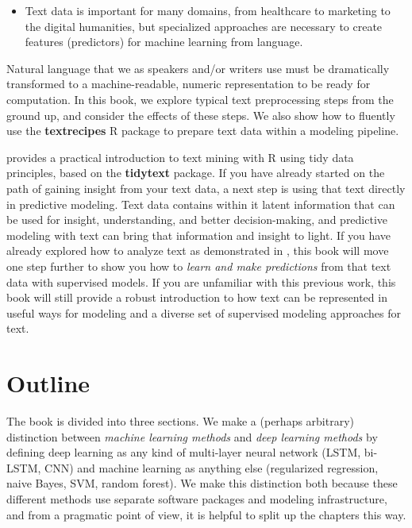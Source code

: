\documentclass[
]{krantz}
\newenvironment{rmdblock}[1]
  {\begin{shaded*}
  \begin{itemize}[left = -1cm, labelsep = 1cm]
  \renewcommand{\labelitemi}{
    \raisebox{-.7\height}[0pt][0pt]{
      {\setkeys{Gin}{width=3em,keepaspectratio}\texttt{[image: images/\#1]}}
    }
  }
 
  \item
  }
  {
  \end{itemize}
  \end{shaded*}
  }
\newenvironment{rmdnote}
  {\begin{rmdblock}{note}}
  {\end{rmdblock}}
\begin{document}
\begin{rmdnote}
Text data is important for many domains, from healthcare to marketing to
the digital humanities, but specialized approaches are necessary to
create features (predictors) for machine learning from language.
\end{rmdnote}

Natural language that we as speakers and/or writers use must be dramatically transformed to a machine-readable, numeric representation to be ready for computation. In this book, we explore typical text preprocessing steps from the ground up, and consider the effects of these steps. We also show how to fluently use the \textbf{textrecipes} R package \citep{textrecipes} to prepare text data within a modeling pipeline.

\citet{Silge2017} provides a practical introduction to text mining with R using tidy data principles, based on the \textbf{tidytext} package. If you have already started on the path of gaining insight from your text data, a next step is using that text directly in predictive modeling. Text data contains within it latent information that can be used for insight, understanding, and better decision-making, and predictive modeling with text can bring that information and insight to light. If you have already explored how to analyze text as demonstrated in \citet{Silge2017}, this book will move one step further to show you how to \emph{learn and make predictions} from that text data with supervised models. If you are unfamiliar with this previous work, this book will still provide a robust introduction to how text can be represented in useful ways for modeling and a diverse set of supervised modeling approaches for text.

\hypertarget{outline}{%
\section*{Outline}\label{outline}}


The book is divided into three sections. We make a (perhaps arbitrary) distinction between \emph{machine learning methods} and \emph{deep learning methods} by defining deep learning as any kind of multi-layer neural network (LSTM, bi-LSTM, CNN) and machine learning as anything else (regularized regression, naive Bayes, SVM, random forest). We make this distinction both because these different methods use separate software packages and modeling infrastructure, and from a pragmatic point of view, it is helpful to split up the chapters this way.
\end{document}
